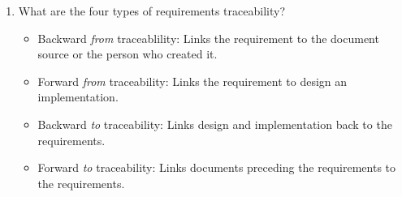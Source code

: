 \documentclass[11pt]{article}
\begin{document}
\begin{enumerate}
    \item What are the four types of requirements traceability?
    \begin{itemize}
        \item Backward \textit{from} traceablility: Links the requirement to the document source or the person who created it.
        \item Forward \textit{from} traceability: Links the requirement to design an implementation.
        \item Backward \textit{to} traceability: Links design and implementation back to the requirements.
        \item Forward \textit{to} traceability: Links documents preceding the requirements to the requirements.
    \end{itemize}
    
    \end{enumerate}
    
    
\end{document}
